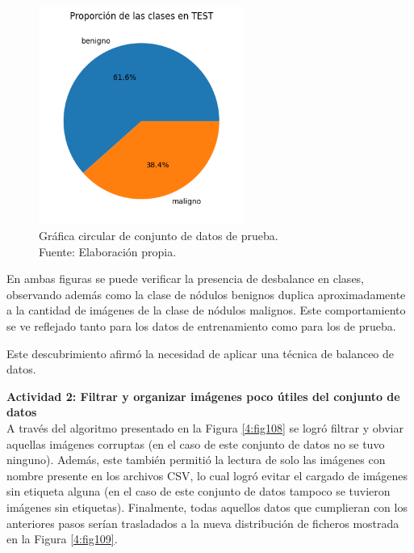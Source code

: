 \begin{figure}[H]
	\begin{center}
		\includegraphics[width=0.60\textwidth]{4/figures/test_circular.png}
		\caption[Gráfica circular de conjunto de datos de prueba]{Gráfica circular de conjunto de datos de prueba. \\
		Fuente: Elaboración propia.}
		\label{4:fig107}
	\end{center}
\end{figure}

En ambas figuras se puede verificar la presencia de desbalance en clases, observando además como la clase de nódulos benignos duplica aproximadamente a la cantidad de imágenes de la clase de nódulos malignos. Este comportamiento se ve reflejado tanto para los datos de entrenamiento como para los de prueba.

Este descubrimiento afirmó la necesidad de aplicar una técnica de balanceo de datos.

\textbf{Actividad 2: Filtrar y organizar imágenes poco útiles del conjunto de datos}
\\
A través del algoritmo presentado en la Figura \ref{4:fig108} se logró filtrar y obviar aquellas imágenes corruptas (en el caso de este conjunto de datos no se tuvo ninguno). Además, este también permitió la lectura de solo las imágenes con nombre presente en los archivos CSV, lo cual logró evitar el cargado de imágenes sin etiqueta alguna (en el caso de este conjunto de datos tampoco se tuvieron imágenes sin etiquetas). Finalmente, todas aquellos datos que cumplieran con los anteriores pasos serían trasladados a la nueva distribución de ficheros mostrada en la Figura \ref{4:fig109}.

